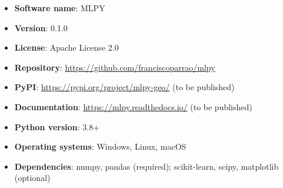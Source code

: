 \documentclass[twoside,11pt]{article}
\begin{document}
\begin{itemize}
\item \textbf{Software name}: MLPY
\item \textbf{Version}: 0.1.0
\item \textbf{License}: Apache License 2.0
\item \textbf{Repository}: \url{https://github.com/franciscoparrao/mlpy}
\item \textbf{PyPI}: \url{https://pypi.org/project/mlpy-geo/} (to be published)
\item \textbf{Documentation}: \url{https://mlpy.readthedocs.io/} (to be published)
\item \textbf{Python version}: 3.8+
\item \textbf{Operating systems}: Windows, Linux, macOS
\item \textbf{Dependencies}: numpy, pandas (required); scikit-learn, scipy, matplotlib (optional)
\end{itemize}



\end{document}
